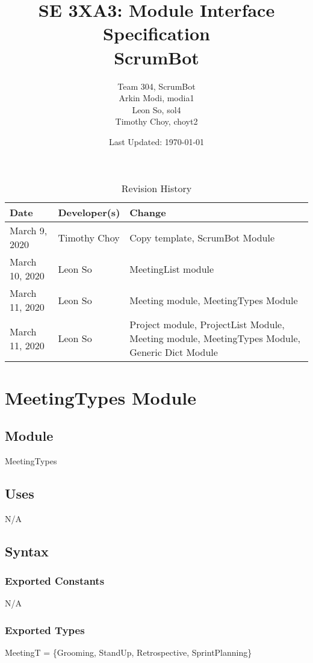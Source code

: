 \documentclass[12pt, titlepage]{article}
\title{SE 3XA3: Module Interface Specification\\ScrumBot}
\author{
    Team 304, ScrumBot
        \\ Arkin Modi, modia1
        \\ Leon So, sol4
        \\ Timothy Choy, choyt2
}
\date{Last Updated: \today}
\begin{document}
\maketitle

\begin{table}[H]
    \caption{Revision History} \label{TblRevisionHistory}
    \begin{tabularx}{\textwidth}{llX}
        \toprule
            \textbf{Date} & \textbf{Developer(s)} & \textbf{Change}\\
        \midrule
            March 9, 2020 & Timothy Choy & Copy template, ScrumBot Module\\
            March 10, 2020 & Leon So & MeetingList module\\
            March 11, 2020 & Leon So & Meeting module, MeetingTypes Module\\
            March 11, 2020 & Leon So & Project module, ProjectList Module, Meeting module, MeetingTypes Module, Generic Dict Module\\
        \bottomrule
    \end{tabularx}
\end{table}

\newpage

\section* {MeetingTypes Module}

\subsection* {Module}
MeetingTypes

\subsection*{Uses}
N/A

\subsection*{Syntax}
\subsubsection*{Exported Constants}
N/A
\subsubsection*{Exported Types}
MeetingT = \{Grooming, StandUp, Retrospective, SprintPlanning\}
\end{document}

